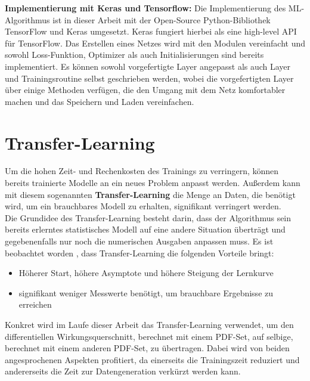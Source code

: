\textbf{Implementierung mit Keras und Tensorflow:}
Die Implementierung des ML-Algorithmus ist in dieser Arbeit mit der Open-Source Python-Bibliothek TensorFlow und Keras \cite{Keras} umgesetzt. Keras fungiert hierbei als eine high-level API für TensorFlow. Das Erstellen eines Netzes wird mit den Modulen vereinfacht und sowohl Loss-Funktion, Optimizer als auch Initialisierungen sind bereits implementiert. Es können sowohl vorgefertigte Layer angepasst als auch Layer und Trainingsroutine selbst geschrieben werden, wobei die vorgefertigten Layer über einige Methoden verfügen, die den Umgang mit dem Netz komfortabler machen und das Speichern und Laden vereinfachen. 

\section{Transfer-Learning}
\label{transfer-learning}
Um die hohen Zeit- und Rechenkosten des Trainings zu verringern, können bereits trainierte Modelle an ein neues Problem anpasst werden. Außerdem kann mit diesem sogenannten \textbf{Transfer-Learning} die Menge an Daten, die benötigt wird, um ein brauchbares Modell zu erhalten, signifikant verringert werden. \\
Die Grundidee des Transfer-Learning besteht darin, dass der Algorithmus sein bereits erlerntes statistisches Modell auf eine andere Situation überträgt und gegebenenfalls nur noch die numerischen Ausgaben anpassen muss. Es ist beobachtet worden \cite{TL}, dass Transfer-Learning die folgenden Vorteile bringt: 
\begin{itemize}
	\setlength\itemsep{0cm}
	\setlength{\parskip}{0cm}
	\item Höherer Start, höhere Asymptote und höhere Steigung der Lernkurve
	\item signifikant weniger Messwerte benötigt, um brauchbare Ergebnisse zu erreichen
\end{itemize}
Konkret wird im Laufe dieser Arbeit das Transfer-Learning verwendet, um den differentiellen Wirkungsquerschnitt, berechnet mit einem PDF-Set, auf selbige, berechnet mit einem anderen PDF-Set, zu übertragen. Dabei wird von beiden angesprochenen Aspekten profitiert, da einerseits die Trainingszeit reduziert und andererseits die Zeit zur Datengeneration verkürzt werden kann.

